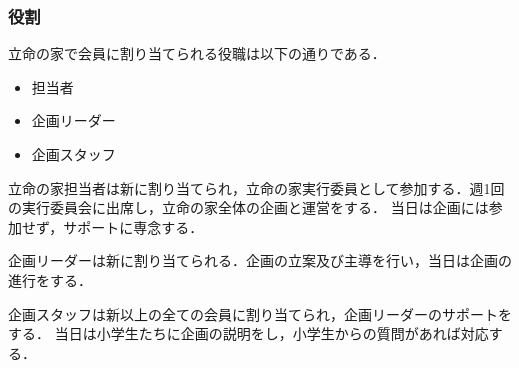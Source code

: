 \subsubsection*{役割}
立命の家で会員に割り当てられる役職は以下の通りである．
\begin{itemize}
  \item 担当者
  \item 企画リーダー
  \item 企画スタッフ
\end{itemize} 

立命の家担当者は新\secondGrade{}に割り当てられ，立命の家実行委員として参加する．週1回の実行委員会に出席し，立命の家全体の企画と運営をする．
当日は企画には参加せず，サポートに専念する．

企画リーダーは新\secondGrade{}に割り当てられる．企画の立案及び主導を行い，当日は企画の進行をする．

企画スタッフは新\firstGrade{}以上の全ての会員に割り当てられ，企画リーダーのサポートをする．
当日は小学生たちに企画の説明をし，小学生からの質問があれば対応する．